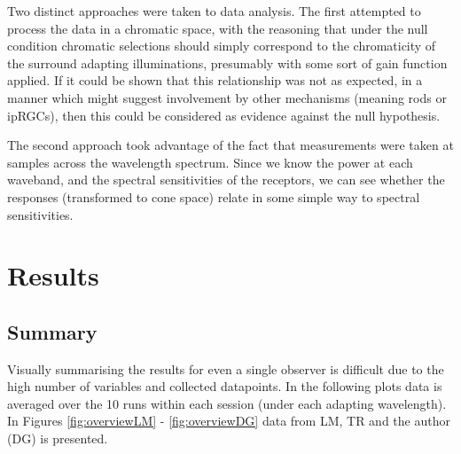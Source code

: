 Two distinct approaches were taken to data analysis. The first attempted to process the data in a chromatic space, with the reasoning that under the null condition chromatic selections should simply correspond to the chromaticity of the surround adapting illuminations, presumably with some sort of gain function applied. If it could be shown that this relationship was not as expected, in a manner which might suggest involvement by other mechanisms (meaning rods or \glspl{ipRGC}), then this could be considered as evidence against the null hypothesis.

The second approach took advantage of the fact that measurements were taken at samples across the wavelength spectrum. Since we know the power at each waveband, and the spectral sensitivities of the receptors, we can see whether the responses (transformed to cone space) relate in some simple way to spectral sensitivities.


\section{Results}

\subsection{Summary}

Visually summarising the results for even a single observer is difficult due to the high number of variables and collected datapoints. In the following plots data is averaged over the 10 runs within each session (under each adapting wavelength). In Figures \ref{fig:overviewLM} - \ref{fig:overviewDG} data from LM, TR and the author (DG) is presented.

